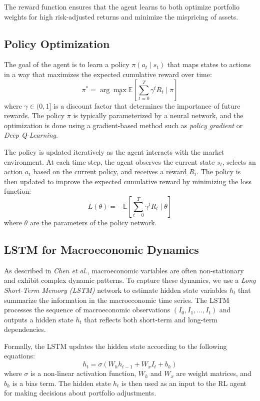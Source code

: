 The reward function ensures that the agent learns to both optimize portfolio weights for high risk-adjusted returns and minimize the mispricing of assets.

\subsection{Policy Optimization}

The goal of the agent is to learn a policy $\pi(a_t \mid s_t)$ that maps states to actions in a way that maximizes the expected cumulative reward over time:
\[
\pi^* = \arg \max_{\pi} \mathbb{E}\left[\sum_{t=0}^T \gamma^t R_t \mid \pi \right]
\]
where $\gamma \in (0, 1]$ is a discount factor that determines the importance of future rewards. The policy $\pi$ is typically parameterized by a neural network, and the optimization is done using a gradient-based method such as \textit{policy gradient} or \textit{Deep Q-Learning}.

The policy is updated iteratively as the agent interacts with the market environment. At each time step, the agent observes the current state $s_t$, selects an action $a_t$ based on the current policy, and receives a reward $R_t$. The policy is then updated to improve the expected cumulative reward by minimizing the loss function:
\[
L(\theta) = -\mathbb{E}\left[\sum_{t=0}^T \gamma^t R_t \mid \theta \right]
\]
where $\theta$ are the parameters of the policy network.

\subsection{LSTM for Macroeconomic Dynamics}

As described in \textit{Chen et al.}, macroeconomic variables are often non-stationary and exhibit complex dynamic patterns. To capture these dynamics, we use a \textit{Long Short-Term Memory (LSTM)} network to estimate hidden state variables $h_t$ that summarize the information in the macroeconomic time series. The LSTM processes the sequence of macroeconomic observations $\left(I_0, I_1, \ldots, I_t\right)$ and outputs a hidden state $h_t$ that reflects both short-term and long-term dependencies.

Formally, the LSTM updates the hidden state according to the following equations:
\[
h_t = \sigma\left(W_h h_{t-1} + W_x I_t + b_h \right)
\]
where $\sigma$ is a non-linear activation function, $W_h$ and $W_x$ are weight matrices, and $b_h$ is a bias term. The hidden state $h_t$ is then used as an input to the RL agent for making decisions about portfolio adjustments.

